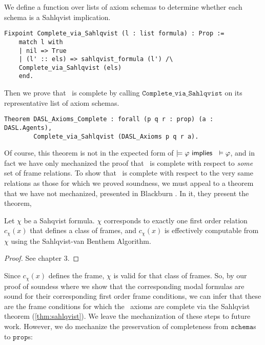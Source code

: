 We define a function over lists of axiom schemas to determine whether each schema is a Sahlqvist implication.

\begin{tcolorbox}
	\begin{lstlisting}[language=Coq]
	Fixpoint Complete_via_Sahlqvist (l : list formula) : Prop :=  
	match l with
	| nil => True
	| (l' :: els) => sahlqvist_formula (l') /\ 
	Complete_via_Sahlqvist (els)
	end.
	\end{lstlisting}
\end{tcolorbox}

Then we prove that \DASL\ is complete by calling $\mathtt{Complete\_via\_Sahlqvist}$ on its representative list of axiom schemas.

\begin{tcolorbox}
	\begin{lstlisting}[language=Coq]
Theorem DASL_Axioms_Complete : forall (p q r : prop) (a : DASL.Agents),
		Complete_via_Sahlqvist (DASL_Axioms p q r a).
	\end{lstlisting}
\end{tcolorbox}

Of course, this theorem is not in the expected form of $\models \varphi \textsf{\ implies \ } \vDash \varphi$, and in fact we have only mechanized the proof that \DASL\ is complete with respect to \emph{some} set of frame relations. To show that \DASL\ is complete with respect to the very same relations as those for which we proved soundness, we must appeal to a theorem that we have not mechanized, presented in Blackburn \etal\cite{modal}. In it, they present the theorem,

\begin{theorem}\label{thm:correspondence}
	Let $\chi$ be a Sahqvist formula. $\chi$ corresponds to exactly one first order relation $c_\chi(x)$ that defines a class of frames, and $c_\chi(x)$ is effectively computable from $\chi$ using the Sahlqvist-van Benthem Algorithm.
\end{theorem}
\begin{proof}
	See \cite{modal} chapter 3.
\end{proof}

Since $c_\chi(x)$ defines the frame, $\chi$ is valid for that class of frames. So, by our proof of soundess where we show that the corresponding modal formulas are sound for their corresponding first order frame conditions, we can infer that these are the frame conditions for which the \DASL\ axioms are complete via the Sahlqvist theorem (\ref{thm:sahlqvist}). We leave the mechanization of these steps to future work. However, we do mechanize the preservation of completeness from $\mathtt{schema}$s to $\mathtt{prop}$s:

